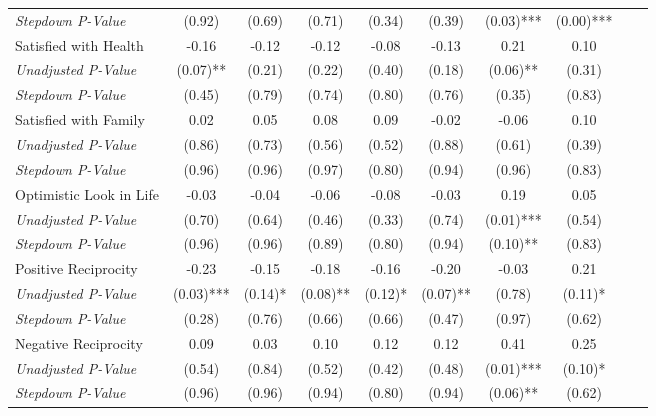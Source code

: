 \begin{tabular}{l c c c c c c c c c}
\quad \textit{Stepdown P-Value} & (0.92) & (0.69) & (0.71) & (0.34) & (0.39) & (0.03)*** & (0.00)*** \\
Satisfied with Health & -0.16 & -0.12 & -0.12 & -0.08 & -0.13 & 0.21 & 0.10 \\
\quad \textit{Unadjusted P-Value} & (0.07)** & (0.21) & (0.22) & (0.40) & (0.18) & (0.06)** & (0.31) \\
\quad \textit{Stepdown P-Value} & (0.45) & (0.79) & (0.74) & (0.80) & (0.76) & (0.35) & (0.83) \\
Satisfied with Family & 0.02 & 0.05 & 0.08 & 0.09 & -0.02 & -0.06 & 0.10 \\
\quad \textit{Unadjusted P-Value} & (0.86) & (0.73) & (0.56) & (0.52) & (0.88) & (0.61) & (0.39) \\
\quad \textit{Stepdown P-Value} & (0.96) & (0.96) & (0.97) & (0.80) & (0.94) & (0.96) & (0.83) \\
Optimistic Look in Life & -0.03 & -0.04 & -0.06 & -0.08 & -0.03 & 0.19 & 0.05 \\
\quad \textit{Unadjusted P-Value} & (0.70) & (0.64) & (0.46) & (0.33) & (0.74) & (0.01)*** & (0.54) \\
\quad \textit{Stepdown P-Value} & (0.96) & (0.96) & (0.89) & (0.80) & (0.94) & (0.10)** & (0.83) \\
Positive Reciprocity & -0.23 & -0.15 & -0.18 & -0.16 & -0.20 & -0.03 & 0.21 \\
\quad \textit{Unadjusted P-Value} & (0.03)*** & (0.14)* & (0.08)** & (0.12)* & (0.07)** & (0.78) & (0.11)* \\
\quad \textit{Stepdown P-Value} & (0.28) & (0.76) & (0.66) & (0.66) & (0.47) & (0.97) & (0.62) \\
Negative Reciprocity & 0.09 & 0.03 & 0.10 & 0.12 & 0.12 & 0.41 & 0.25 \\
\quad \textit{Unadjusted P-Value} & (0.54) & (0.84) & (0.52) & (0.42) & (0.48) & (0.01)*** & (0.10)* \\
\quad \textit{Stepdown P-Value} & (0.96) & (0.96) & (0.94) & (0.80) & (0.94) & (0.06)** & (0.62) \\
\bottomrule
\end{tabular}
